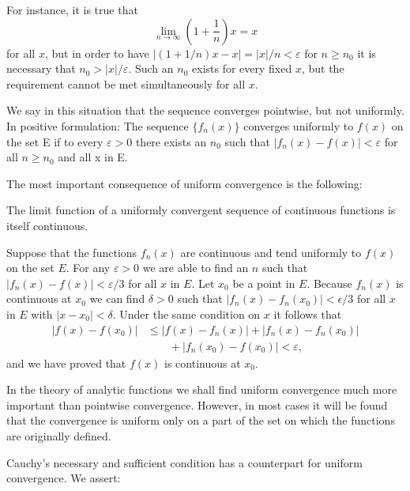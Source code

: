 For instance, it is true that
\begin{equation*}
\lim _ {n \rightarrow \infty} \left(1 + \frac {1}{n}\right) x = x
\end{equation*}
for all $x$, but in order to have $|(1 + 1/n)x - x| = |x|/n < \varepsilon$ for $n \geq n_0$ it is necessary that $n_0 > |x|/\varepsilon$. Such an $n_0$ exists for every fixed $x$, but the requirement cannot be met simultaneously for all $x$.

We say in this situation that the sequence converges pointwise, but not uniformly. In positive formulation: The sequence $\{f_{n}(x)\}$ converges uniformly to $f(x)$ on the set E if to every $\varepsilon > 0$ there exists an $n_{0}$ such that $|f_{n}(x) - f(x)| < \varepsilon$ for all $n \geq n_{0}$ and all x in E.

The most important consequence of uniform convergence is the following:

The limit function of a uniformly convergent sequence of continuous functions is itself continuous.

Suppose that the functions $f_{n}(x)$ are continuous and tend uniformly to $f(x)$ on the set $E$. For any $\varepsilon > 0$ we are able to find an $n$ such that $|f_{n}(x) - f(x)| < \varepsilon / 3$ for all $x$ in $E$. Let $x_0$ be a point in $E$. Because $f_{n}(x)$ is continuous at $x_0$ we can find $\delta > 0$ such that $|f_{n}(x) - f_{n}(x_0)| < \epsilon / 3$ for all $x$ in $E$ with $|x - x_0| < \delta$. Under the same condition on $x$ it follows that
\begin{equation*}
\begin{aligned}
|f(x)-f(x_0)|&\leq |f(x)-f_n(x)|+|f_n(x)-f_n(x_0)|\\
&\qquad+|f_n(x_0)-f(x_0)|<\varepsilon,
\end{aligned}
\end{equation*}
and we have proved that $f(x)$ is continuous at $x_{0}$.

In the theory of analytic functions we shall find uniform convergence much more important than pointwise convergence. However, in most cases it will be found that the convergence is uniform only on a part of the set on which the functions are originally defined.

Cauchy's necessary and sufficient condition has a counterpart for uniform convergence. We assert:

